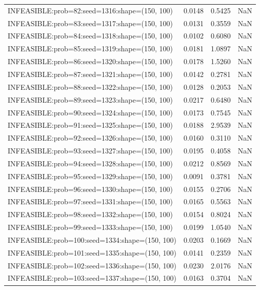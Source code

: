 \begin{longtable}{lccc}
INFEASIBLE:prob=82:seed=1316:shape=(150, 100)  &   0.0148 &  0.5425 &    NaN \\
INFEASIBLE:prob=83:seed=1317:shape=(150, 100)  &   0.0131 &  0.3559 &    NaN \\
INFEASIBLE:prob=84:seed=1318:shape=(150, 100)  &   0.0102 &  0.6080 &    NaN \\
INFEASIBLE:prob=85:seed=1319:shape=(150, 100)  &   0.0181 &  1.0897 &    NaN \\
INFEASIBLE:prob=86:seed=1320:shape=(150, 100)  &   0.0178 &  1.5260 &    NaN \\
INFEASIBLE:prob=87:seed=1321:shape=(150, 100)  &   0.0142 &  0.2781 &    NaN \\
INFEASIBLE:prob=88:seed=1322:shape=(150, 100)  &   0.0128 &  0.2053 &    NaN \\
INFEASIBLE:prob=89:seed=1323:shape=(150, 100)  &   0.0217 &  0.6480 &    NaN \\
INFEASIBLE:prob=90:seed=1324:shape=(150, 100)  &   0.0173 &  0.7545 &    NaN \\
INFEASIBLE:prob=91:seed=1325:shape=(150, 100)  &   0.0188 &  2.9539 &    NaN \\
INFEASIBLE:prob=92:seed=1326:shape=(150, 100)  &   0.0160 &  0.3110 &    NaN \\
INFEASIBLE:prob=93:seed=1327:shape=(150, 100)  &   0.0195 &  0.4058 &    NaN \\
INFEASIBLE:prob=94:seed=1328:shape=(150, 100)  &   0.0212 &  0.8569 &    NaN \\
INFEASIBLE:prob=95:seed=1329:shape=(150, 100)  &   0.0091 &  0.3781 &    NaN \\
INFEASIBLE:prob=96:seed=1330:shape=(150, 100)  &   0.0155 &  0.2706 &    NaN \\
INFEASIBLE:prob=97:seed=1331:shape=(150, 100)  &   0.0165 &  0.5563 &    NaN \\
INFEASIBLE:prob=98:seed=1332:shape=(150, 100)  &   0.0154 &  0.8024 &    NaN \\
INFEASIBLE:prob=99:seed=1333:shape=(150, 100)  &   0.0199 &  1.0540 &    NaN \\
INFEASIBLE:prob=100:seed=1334:shape=(150, 100) &   0.0203 &  0.1669 &    NaN \\
INFEASIBLE:prob=101:seed=1335:shape=(150, 100) &   0.0141 &  0.2359 &    NaN \\
INFEASIBLE:prob=102:seed=1336:shape=(150, 100) &   0.0230 &  2.0176 &    NaN \\
INFEASIBLE:prob=103:seed=1337:shape=(150, 100) &   0.0163 &  0.3704 &    NaN \\

\end{longtable}
